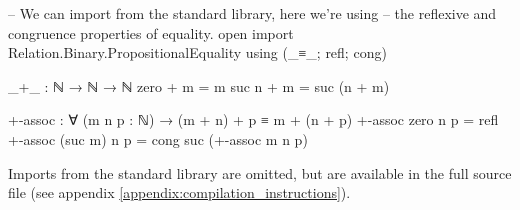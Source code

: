 \documentclass[logo,bsc,singlespacing,parskip,online]{infthesis}
\renewenvironment{code}{\mintedcopy[breaklines,breaksymbolleft=\;]{agda}}{\endmintedcopy}
\begin{document}
\begin{code}
  -- We can import from the standard library, here we're using
  -- the reflexive and congruence properties of equality.
  open import Relation.Binary.PropositionalEquality
    using (_≡_; refl; cong)

  _+_ : ℕ → ℕ → ℕ
  zero  + m = m
  suc n + m = suc (n + m)

  +-assoc : ∀ (m n p : ℕ) → (m + n) + p ≡ m + (n + p)
  +-assoc zero    n p = refl
  +-assoc (suc m) n p = cong suc (+-assoc m n p)
\end{code}

Imports from the standard library \citep{the_agda_community_agda_2024} are omitted, but are
available in the full source file (see appendix \ref{appendix:compilation_instructions}).
\begin{comment}
\begin{code}
-- Data types (naturals, strings, characters)
open import Data.Nat using (ℕ; zero; suc; _<_; _≥_; _≤_; _≤?_; _<?_; z≤n; s≤s; _⊔_)
  renaming (_≟_ to _≟ℕ_)
open import Data.Nat.Properties using (≤-refl; ≤-trans; ≤-<-trans; <-≤-trans; ≤-antisym; ≤-total;
  +-mono-≤; n≤1+n; m≤n⇒m≤1+n; suc-injective; <⇒≢; ≰⇒>; ≮⇒≥)
open import Data.String using (String; fromList) renaming (_≟_ to _≟str_; _++_ to _++str_;
  length to str-length; toList to ⟪_⟫)
open import Data.Char using (Char)
open import Data.Char.Properties using () renaming (_≟_ to _≟char_)

-- Function manipulation.
open import Function using (_∘_; flip; it; id; case_returning_of_)

-- Relations and predicates/decidability.
import Relation.Binary.PropositionalEquality as Eq
open Eq using (_≡_; _≢_; refl; sym; trans; cong; cong-app; cong₂)
open Eq.≡-Reasoning using (begin_; step-≡-∣; step-≡-⟩; _∎)
open import Relation.Binary.Definitions using (DecidableEquality)
open import Relation.Nullary.Decidable using (Dec; yes; no; True; False; toWitnessFalse;
  toWitness; fromWitness; ¬?; ⌊_⌋; From-yes)
open import Relation.Unary using (Decidable)
open import Relation.Binary using () renaming (Decidable to BinaryDecidable)
open import Relation.Nullary.Negation using (¬_; contradiction)
open import Data.Empty using (⊥-elim)

-- Products and exists quantifier.
open import Data.Product using (_×_; proj₁; proj₂; ∃-syntax) renaming (_,_ to ⟨_,_⟩)

-- Lists.
open import Data.List using (List; []; _∷_; _++_; length; filter; map; foldr; head; replicate)
open import Data.List.Properties using (≡-dec)
import Data.List.Membership.DecPropositional as DecPropMembership
open import Data.List.Relation.Unary.All using (All; all?; lookup)
  renaming (fromList to All-fromList; toList to All-toList)
open import Data.List.Relation.Unary.Any using (Any; here; there)
open import Data.List.Extrema Data.Nat.Properties.≤-totalOrder using (max; xs≤max)


\end{comment}
\end{document}
